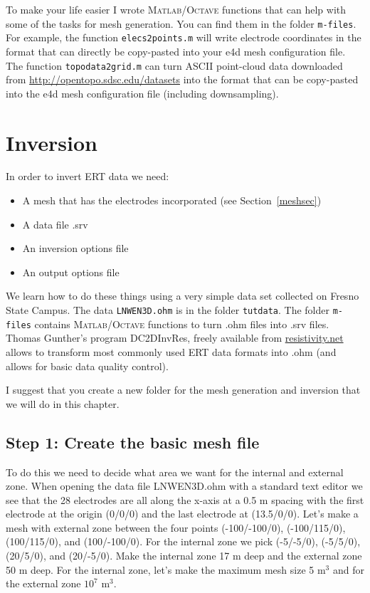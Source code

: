 \documentclass[11pt]{article}
\begin{document}
To make your life easier I wrote \textsc{Matlab}/\textsc{Octave}
functions that can help with some of the tasks for mesh
generation. You can find them in the folder \verb+m-files+. For
example, the function \verb+elecs2points.m+ will write electrode
coordinates in the format that can directly be copy-pasted into your
e4d mesh configuration file. The function \verb+topodata2grid.m+ can
turn ASCII point-cloud data downloaded from
\url{http://opentopo.sdsc.edu/datasets} into the format that can be
copy-pasted into the e4d mesh configuration file (including
downsampling).


\section{Inversion}

In order to invert ERT data we need:

\begin{itemize}
\item A mesh that has the electrodes incorporated (see Section~\ref{meshsec})
\item A data file .srv
\item An inversion options file
\item An output options file
\end{itemize}

We learn how to do these things using a very simple data set collected on Fresno State Campus. The data \verb+LNWEN3D.ohm+ is in the folder \verb+tutdata+. The folder \verb+m-files+ contains \textsc{Matlab}/\textsc{Octave} functions to turn .ohm files into .srv files. Thomas Gunther's program DC2DInvRes, freely available from \url{resistivity.net} allows to transform most commonly used ERT data formats into .ohm (and allows for basic data quality control).

I suggest that you create a new folder for the mesh generation and inversion that we will do in this chapter.

\subsection{Step 1: Create the basic mesh file}
To do this we need to decide what area we want for the internal and
external zone. When opening the data file LNWEN3D.ohm with a standard
text editor we see that the 28 electrodes are all along the x-axis at
a 0.5 m spacing with the first electrode at the origin (0/0/0) and the
last electrode at (13.5/0/0). Let's make a mesh with external zone
between the four points (-100/-100/0), (-100/115/0), (100/115/0), and
(100/-100/0). For the internal zone we pick (-5/-5/0), (-5/5/0),
(20/5/0), and (20/-5/0). Make the internal zone 17 m deep and the
external zone 50 m deep. For the internal zone, let's make the maximum
mesh size 5 m$^3$ and for the external zone $10^7$ m$^3$.
\end{document}
